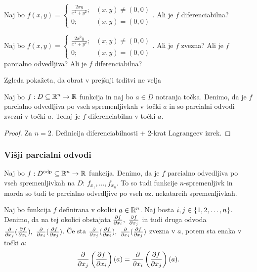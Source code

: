 \begin{zgled}
    Naj bo $f(x,y) = \begin{cases}
        \frac{2xy}{x^2+y^2}; &(x,y) \neq (0,0) \\
        0; &(x,y) = (0,0)
    \end{cases}$. Ali je $f$ diferenciabilna?
\end{zgled}

\begin{zgled}
    Naj bo $f(x,y) = \begin{cases}
        \frac{2x^2y}{x^2+y^2}; &(x,y) \neq (0,0) \\
        0; &(x,y) = (0,0)
    \end{cases}$. Ali je $f$ zvezna? Ali je $f$ parcialno odvedljiva? Ali je $f$ diferenciabilna?
\end{zgled}

\begin{opomba}
    Zgleda pokažeta, da obrat v prejšnji trditvi ne velja
\end{opomba}

\begin{izrek}
    Naj bo $f: D \subseteq \mathbb{R}^n \to \mathbb{R}$ funkcija in naj bo $a \in D$ notranja točka. Denimo, da je $f$ parcialno odvedljiva po vseh spremenljivkah v točki $a$ in so parcialni odvodi zvezni v točki $a$. Tedaj je $f$ diferenciabilna v točki $a$.
\end{izrek}

\begin{proof}
    Za $n=2$. Definicija diferenciabilnosti + 2-krat Lagrangeev izrek.
\end{proof}

\subsubsection{Višji parcialni odvodi}
Naj bo $f: D^{\text{odp}} \subseteq \mathbb{R}^n \to \mathbb{R}$ funkcija. Denimo, da je $f$ parcialno odvedljiva po vseh spremenljivkah na $D$: $f_{x_1}, \ldots, f_{x_n}$. To so tudi funkcije $n$-spremenljivk in morda so tudi te parcialno odvedljive po vseh oz. nekatareih spremenljivkah.

\begin{trditev}
    Naj bo funkcija $f$ definirana v okolici $a \in \mathbb{R}^n$. Naj bosta $i, j \in \left\{1, 2, \ldots, n\right\}$. Denimo, da na tej okolici obstajata $\frac{\partial f}{\partial x_i}, \ \frac{\partial f}{\partial x_j}$ in tudi druga odvoda $\frac{\partial}{\partial x_j} (\podv{f}{x_i}), \ \frac{\partial}{\partial x_i} (\podv{f}{x_j})$. Če sta $\frac{\partial}{\partial x_j} (\podv{f}{x_i}), \ \frac{\partial}{\partial x_i} (\podv{f}{x_j})$ zvezna v $a$, potem sta enaka v točki $a$: 
    $$\frac{\partial}{\partial x_j} \left(\frac{\partial f}{\partial x_i}\right)(a) = \frac{\partial}{\partial x_i} \left(\frac{\partial f}{\partial x_j}\right)(a).$$
\end{trditev}

